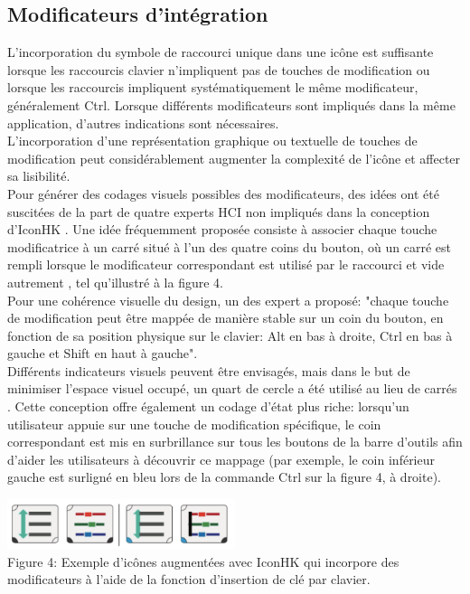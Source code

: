 \documentclass[12pt,a4paper]{article}
\newcommand\tab[1][0.65cm]{\hspace*{#1}}
\begin{document}
\subsection{Modificateurs d’intégration}
L'incorporation du symbole de raccourci unique dans une icône est suffisante lorsque les raccourcis clavier n'impliquent pas de touches de modification ou lorsque les raccourcis impliquent systématiquement le même modificateur, généralement Ctrl. Lorsque différents modificateurs sont
impliqués dans la même application, d'autres indications sont nécessaires.\\
\tab L'incorporation d'une représentation graphique ou textuelle de touches de modification peut considérablement augmenter la complexité de l'icône et affecter sa lisibilité.\\
\tab Pour générer des codages visuels possibles des modificateurs, des idées ont été suscitées de la part de quatre experts HCI non impliqués dans la conception d’IconHK \cite{3}. Une idée fréquemment
proposée consiste à associer chaque touche modificatrice à un carré situé à l'un des quatre coins du bouton, où un carré est rempli lorsque le modificateur correspondant est utilisé par le raccourci et
vide autrement \cite{3}, tel qu'illustré à la figure 4.\\
\tab Pour une cohérence visuelle du design, un des expert a proposé: "chaque touche de modification peut être mappée de manière stable sur un coin du bouton, en fonction de sa position physique sur le clavier: Alt en bas à droite, Ctrl en bas à gauche et Shift en haut à gauche".\\
\tab Différents indicateurs visuels peuvent être envisagés, mais dans le but de minimiser l’espace visuel
occupé, un quart de cercle a été utilisé au lieu de carrés \cite{3}. Cette conception offre également un
codage d'état plus riche: lorsqu'un utilisateur appuie sur une touche de modification spécifique, le
coin correspondant est mis en surbrillance sur tous les boutons de la barre d’outils afin d'aider les
utilisateurs à découvrir ce mappage (par exemple, le coin inférieur gauche est surligné en bleu lors
de la commande Ctrl sur la figure 4, à droite).
\begin{center}
	\includegraphics[width=0.5\textwidth]{T4.png}\\
	Figure 4: Exemple d'icônes augmentées avec IconHK qui incorpore des modificateurs à l'aide de la
	fonction d'insertion de clé par clavier.
\end{center}
\end{document}
